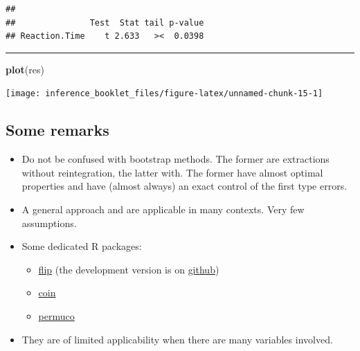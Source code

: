 \documentclass[]{article}
\newenvironment{Shaded}{\begin{snugshade}}{\end{snugshade}}
\newcommand{\KeywordTok}[1]{\textcolor[rgb]{0.13,0.29,0.53}{\textbf{#1}}}
\newcommand{\NormalTok}[1]{#1}
\providecommand{\tightlist}{%
  \setlength{\itemsep}{0pt}\setlength{\parskip}{0pt}}
\begin{document}
\begin{verbatim}
## 
##               Test  Stat tail p-value
## Reaction.Time    t 2.633   ><  0.0398
\end{verbatim}

\begin{center}\rule{0.5\linewidth}{\linethickness}\end{center}

\begin{Shaded}
\begin{Highlighting}[]
\KeywordTok{plot}\NormalTok{(res)}
\end{Highlighting}
\end{Shaded}

\begin{center}\texttt{[image: inference\_booklet\_files/figure-latex/unnamed-chunk-15-1]} \end{center}

\hypertarget{some-remarks-1}{%
\subsection{Some remarks}\label{some-remarks-1}}

\begin{itemize}
\tightlist
\item
  Do not be confused with bootstrap methods. The former are extractions
  without reintegration, the latter with. The former have almost optimal
  properties and have (almost always) an exact control of the first type
  errors.
\item
  A general approach and are applicable in many contexts. Very few
  assumptions.
\item
  Some dedicated R packages:

  \begin{itemize}
  \tightlist
  \item
    \href{http://cran.r-project.org/web/packages/flip/index.html}{flip}
    (the development version is on
    \href{https://github.com/livioivil/flip}{github})
  \item
    \href{http://cran.r-project.org/web/packages/coin/index.html}{coin}
  \item
    \href{https://cran.r-project.org/web/packages/permuco/index.html}{permuco}
  \end{itemize}
\item
  They are of limited applicability when there are many variables
  involved.
\end{itemize}
\end{document}
